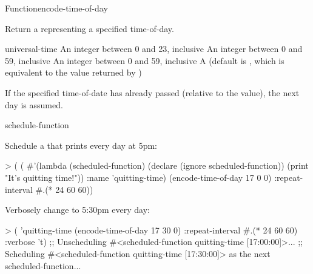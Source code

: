 \documentclass[10pt,twoside,english,pdftex]{article}
\begin{document}

\begin{functiondoc}{Function}{encode-time-of-day}%
  { 
     
    \returns{} }

\fnsyntax

\fnpurpose Return a  representing a specified
time-of-day.

\fnpackage {}

\fnmodule {}

\fnargs
\begin{args}{universal-time}
\arg[hour] An integer between 0 and 23, inclusive
\arg[minute] An integer between 0 and 59, inclusive
\arg[second] An integer between 0 and 59, inclusive
 A  (default is \nil,
  which is equivalent to the value returned by
  )
\end{args}

\fndescription If the specified time-of-date has already passed (relative to
the  value), the next day is assumed.

\begin{alsos}{schedule-function}
\end{alsos}

%
%
\fnexamples
Schedule a  that prints  
every day at 5pm:
\begin{example}
> (
    (
      #'(lambda (scheduled-function)
          (declare (ignore scheduled-function))
          (print "It's quitting time!"))
      :name 'quitting-time)
     (encode-time-of-day 17 0 0) :repeat-interval #.(* 24 60 60))
\end{example}

%
Verbosely change  to 5:30pm every day:
\begin{example}
> ( 'quitting-time (encode-time-of-day 17 30 0)
    :repeat-interval #.(* 24 60 60)
    :verbose 't)
;; Unscheduling #<scheduled-function quitting-time [17:00:00]>...
;; Scheduling #<scheduled-function quitting-time [17:30:00]> 
   as the next scheduled-function...
\end{example}

\end{functiondoc}
\end{document}
